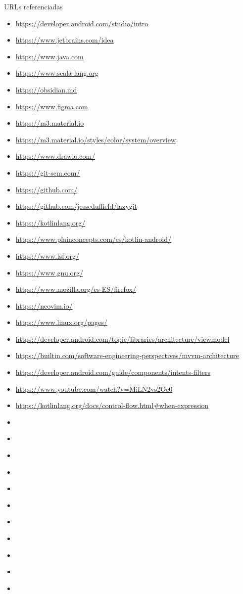 URLs referenciadas
\begin{itemize}
  \item \url{https://developer.android.com/studio/intro}
  \item \url{https://www.jetbrains.com/idea}
  \item \url{https://www.java.com}
  \item \url{https://www.scala-lang.org}
  \item \url{https://obsidian.md}
  \item \url{https://www.figma.com}
  \item \url{https://m3.material.io}
  \item \url{https://m3.material.io/styles/color/system/overview}
  \item \url{https://www.drawio.com/}
  \item \url{https://git-scm.com/}
  \item \url{https://github.com/}
  \item \url{https://github.com/jesseduffield/lazygit}
  \item \url{https://kotlinlang.org/}
  \item \url{https://www.plainconcepts.com/es/kotlin-android/}
  \item \url{https://www.fsf.org/}
  \item \url{https://www.gnu.org/}
  \item \url{https://www.mozilla.org/es-ES/firefox/}
  \item \url{https://neovim.io/}
  \item \url{https://www.linux.org/pages/}
  \item \url{https://developer.android.com/topic/libraries/architecture/viewmodel}
  \item \url{https://builtin.com/software-engineering-perspectives/mvvm-architecture}
  \item \url{https://developer.android.com/guide/components/intents-filters}
  \item \url{https://www.youtube.com/watch?v=MiLN2vs2Oe0}
  \item \url{https://kotlinlang.org/docs/control-flow.html#when-expression}
  \item \url{}
  \item \url{}
  \item \url{}
  \item \url{}
  \item \url{}
  \item \url{}
  \item \url{}
  \item \url{}
  \item \url{}
  \item \url{}
  \item \url{}
\end{itemize}

\makeBib


